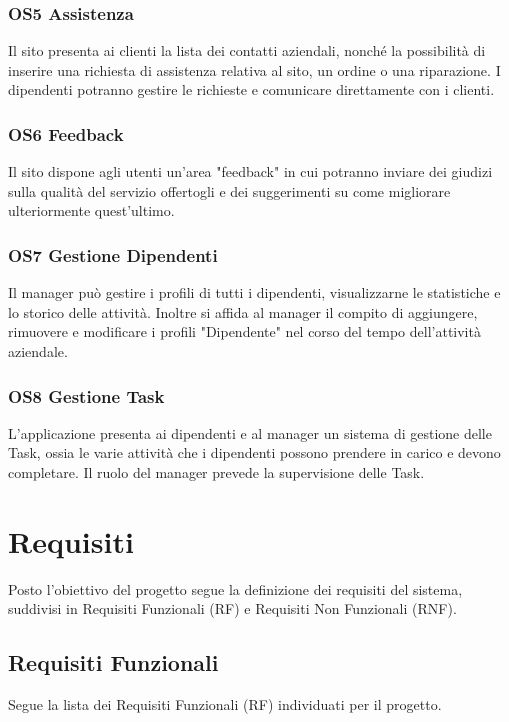 \documentclass{report}
\begin{document}
\subsection*{OS5 Assistenza}
Il sito presenta ai clienti la lista dei contatti aziendali, nonché la possibilità di inserire una richiesta di assistenza relativa al sito, un ordine o una riparazione. I dipendenti potranno gestire le richieste e comunicare direttamente con i clienti.


\subsection*{OS6 Feedback} 
Il sito dispone agli utenti un'area "feedback" in cui potranno inviare dei giudizi sulla qualità del servizio offertogli e dei suggerimenti su come migliorare ulteriormente quest'ultimo.

\subsection*{OS7 Gestione Dipendenti}

Il manager può gestire i profili di tutti i dipendenti, visualizzarne le statistiche e lo storico delle attività. Inoltre si affida al manager il compito di aggiungere, rimuovere e modificare i profili "Dipendente" nel corso del tempo dell'attività aziendale.


\subsection*{OS8 Gestione Task}
L’applicazione presenta ai dipendenti e al manager un sistema di gestione delle Task, ossia le varie attività che i dipendenti possono prendere in carico e devono completare. Il ruolo del manager prevede la supervisione delle Task.


\chapter{Requisiti}
Posto l’obiettivo del progetto segue la definizione dei requisiti del sistema, suddivisi in Requisiti Funzionali (RF) e Requisiti Non Funzionali (RNF).



\section{Requisiti Funzionali}
Segue la lista dei Requisiti Funzionali (RF) individuati per il progetto.
\end{document}
